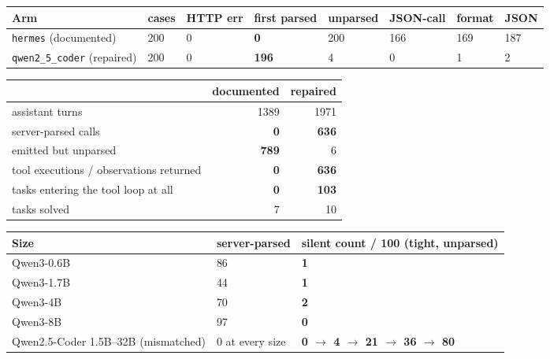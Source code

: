 \begin{center}
\begin{minipage}{\linewidth}
\centering
\small
{}\label{tab:bfclfunnel}
\setlength{\tabcolsep}{3.5pt}\begin{tabular}{@{}llllllll@{}}
\toprule
Arm & cases & HTTP err & first parsed & unparsed & JSON-call & format & JSON \\
\midrule
\texttt{hermes} (documented) & 200 & 0 & \textbf{0} & 200 & 166 & 169 & 187 \\
\texttt{qwen2\_5\_coder} (repaired) & 200 & 0 & \textbf{196} & 4 & 0 & 1 & 2 \\
\bottomrule
\end{tabular}
\end{minipage}
\end{center}
\begin{center}
\begin{minipage}{\linewidth}
\centering
\small
{}\label{tab:tau}
\begin{tabular}{@{}lrr@{}}
\toprule
 & documented & repaired \\
\midrule
assistant turns & 1389 & 1971 \\
server-parsed calls & \textbf{0} & \textbf{636} \\
emitted but unparsed & \textbf{789} & 6 \\
tool executions / observations returned & \textbf{0} & \textbf{636} \\
\midrule
tasks entering the tool loop at all & \textbf{0} & \textbf{103} \\
tasks solved & 7 & 10 \\
\bottomrule
\end{tabular}
\end{minipage}
\end{center}
\begin{center}
\begin{minipage}{\linewidth}
\centering
\small
{}\label{tab:counterfactual}
\begin{tabular}{@{}lll@{}}
\toprule
Size & server-parsed & \textbf{silent count / 100 (tight, unparsed)} \\
\midrule
Qwen3-0.6B & 86 & \textbf{1} \\
Qwen3-1.7B & 44 & \textbf{1} \\
Qwen3-4B & 70 & \textbf{2} \\
Qwen3-8B & 97 & \textbf{0} \\
\midrule
Qwen2.5-Coder 1.5B--32B (mismatched) & 0 at every size & \textbf{0 $\to$ 4 $\to$ 21 $\to$ 36 $\to$ 80} \\
\bottomrule
\end{tabular}
\end{minipage}
\end{center}
